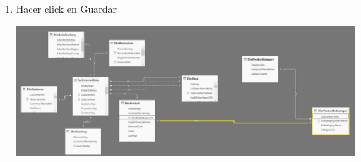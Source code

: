 \begin{enumerate}[1.]
	\item Hacer click en Guardar
	
	\begin{center}
	\includegraphics[width=18cm]{./Imagenes/25} 
	\end{center}

\end{enumerate}


